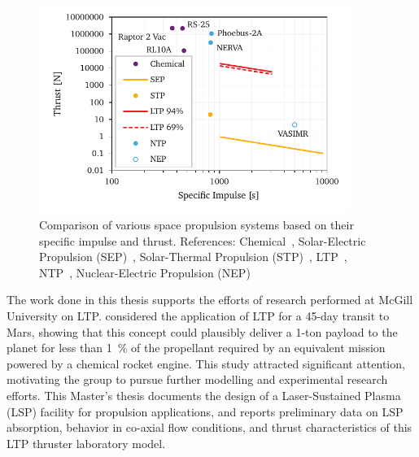         \begin{figure}[h]
            \centering
            \includegraphics[width=0.9\textwidth]{assets/1 intro/propulsionComparison2.pdf}
            \caption[Comparison of various space propulsion systems]{Comparison of various space propulsion systems based on their specific impulse and thrust. References: Chemical~\cite{l3harrisRL10Engine2023,l3harrisRS25Engine2023,belluscioSpaceXAdvancesDrive2014}, Solar-Electric Propulsion (SEP)~\cite{aerojetrocketdyneNEXTCNASAEvolutionary2022}, Solar-Thermal Propulsion (STP)~\cite{woodcockEvaluationSolarThermal}, LTP~\cite{duplayDesignRapidTransit2022,shojiPerformanceHeatTransfer1976}, NTP~\cite{koenigExperienceGainedSpace1986}, Nuclear-Electric Propulsion (NEP)~\cite{adastraTechnology2013}}
            \label{fig:propulsion_comparison}
        \end{figure}

        The work done in this thesis supports the efforts of research performed at McGill University on LTP. \textcite{duplayDesignRapidTransit2022} considered the application of LTP for a 45-day transit to Mars, showing that this concept could plausibly deliver a 1-ton payload to the planet for less than 1~\% of the propellant required by an equivalent mission powered by a chemical rocket engine. This study attracted significant attention, motivating the group to pursue further modelling and experimental research efforts. This Master's thesis documents the design of a Laser-Sustained Plasma (LSP) facility for propulsion applications, and reports preliminary data on LSP absorption, behavior in co-axial flow conditions, and thrust characteristics of this LTP thruster laboratory model.